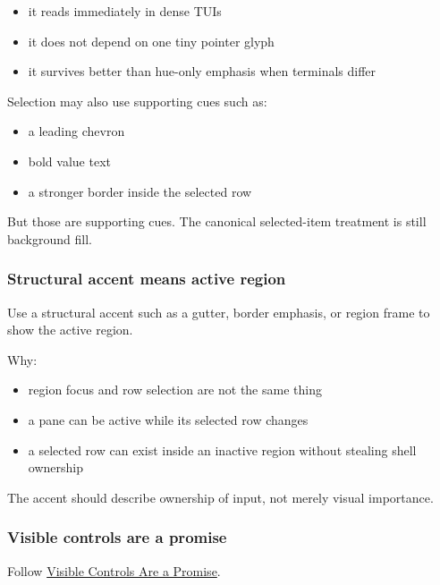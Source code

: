 \begin{itemize}
\tightlist
\item
  it reads immediately in dense TUIs
\item
  it does not depend on one tiny pointer glyph
\item
  it survives better than hue-only emphasis when terminals differ
\end{itemize}

Selection may also use supporting cues such as:

\begin{itemize}
\tightlist
\item
  a leading chevron
\item
  bold value text
\item
  a stronger border inside the selected row
\end{itemize}

But those are supporting cues. The canonical selected-item treatment is still background fill.

\subsubsection{Structural accent means active region}\label{record-023-structural-accent-means-active-region}

Use a structural accent such as a gutter, border emphasis, or region frame to show the active region.

Why:

\begin{itemize}
\tightlist
\item
  region focus and row selection are not the same thing
\item
  a pane can be active while its selected row changes
\item
  a selected row can exist inside an inactive region without stealing shell ownership
\end{itemize}

The accent should describe ownership of input, not merely visual importance.

\subsubsection{Visible controls are a promise}\label{record-023-visible-controls-are-a-promise}

Follow \href{https://github.com/flyingrobots/bijou/blob/cbd70612140e7a450d764b3c7be1c6af878b99bc/docs/invariants/visible-controls-are-a-promise.md}{Visible Controls Are a Promise}.

